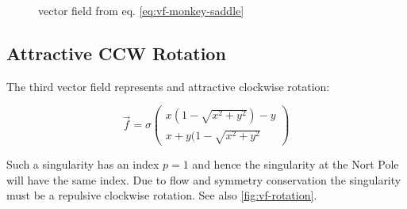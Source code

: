 \documentclass[a4paper,10pt,notitlepage]{scrartcl}
\begin{document}
\begin{figure}
  \centering
  \caption{vector field from eq. \ref{eq:vf-monkey-saddle}}
  \label{fig:vf-monkey-saddle}
\end{figure}

\subsection{Attractive CCW Rotation}

The third vector field represents and attractive clockwise rotation:

\begin{equation}
 \vec{f} = \sigma \left( \begin{array}{c}
                   x(1-\sqrt{x^2+y^2}) -y \\ x + y(1-\sqrt{x^2+y^2}
                  \end{array} \right)
 \label{eq:vf-rotation}
\end{equation}

Such a singularity has an index $p = 1$ and hence the singularity at the Nort
Pole will have the same index. Due to flow and symmetry conservation the
singularity must be a repulsive clockwise rotation. See also
\ref{fig:vf-rotation}.
\end{document}
